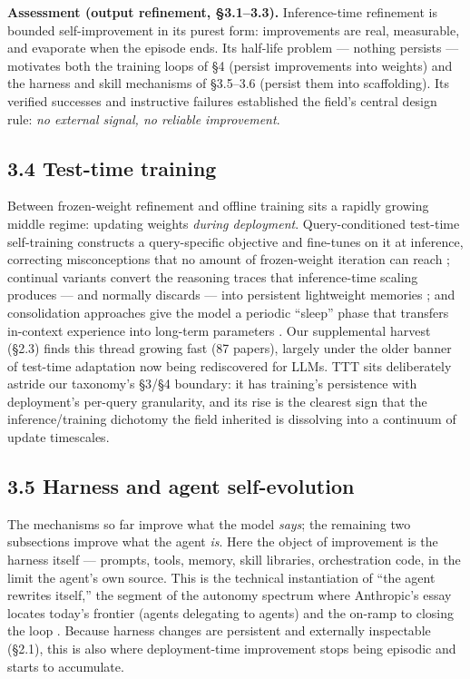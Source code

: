 \documentclass[
  11pt,
]{article}
\begin{document}
\textbf{Assessment (output refinement, §3.1--3.3).} Inference-time
refinement is bounded self-improvement in its purest form: improvements
are real, measurable, and evaporate when the episode ends. Its half-life
problem --- nothing persists --- motivates both the training loops of §4
(persist improvements into weights) and the harness and skill mechanisms
of §3.5--3.6 (persist them into scaffolding). Its verified successes and
instructive failures established the field's central design rule:
\emph{no external signal, no reliable improvement}.

\subsection{3.4 Test-time training}\label{test-time-training}

Between frozen-weight refinement and offline training sits a rapidly
growing middle regime: updating weights \emph{during deployment}.
Query-conditioned test-time self-training constructs a query-specific
objective and fine-tunes on it at inference, correcting misconceptions
that no amount of frozen-weight iteration can reach
\citep{song2026query}; continual variants convert the reasoning traces
that inference-time scaling produces --- and normally discards --- into
persistent lightweight memories \citep{dorovatas2026continual}; and
consolidation approaches give the model a periodic ``sleep'' phase that
transfers in-context experience into long-term parameters
\citep{behrouz2026language}. Our supplemental harvest (§2.3) finds this
thread growing fast (87 papers), largely under the older banner of
test-time adaptation now being rediscovered for LLMs. TTT sits
deliberately astride our taxonomy's §3/§4 boundary: it has training's
persistence with deployment's per-query granularity, and its rise is the
clearest sign that the inference/training dichotomy the field inherited
is dissolving into a continuum of update timescales.

\subsection{3.5 Harness and agent
self-evolution}\label{harness-and-agent-self-evolution}

The mechanisms so far improve what the model \emph{says}; the remaining
two subsections improve what the agent \emph{is}. Here the object of
improvement is the harness itself --- prompts, tools, memory, skill
libraries, orchestration code, in the limit the agent's own source. This
is the technical instantiation of ``the agent rewrites itself,'' the
segment of the autonomy spectrum where Anthropic's essay locates today's
frontier (agents delegating to agents) and the on-ramp to closing the
loop \citep{anthropic2026rsi}. Because harness changes are persistent
and externally inspectable (§2.1), this is also where deployment-time
improvement stops being episodic and starts to accumulate.
\end{document}
